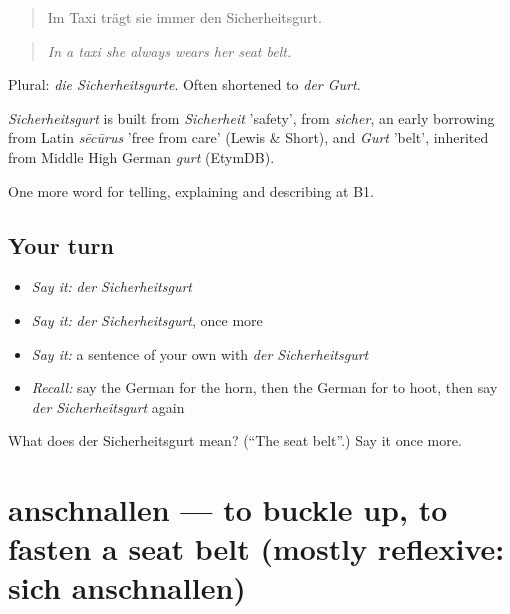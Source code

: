 \begin{quote}
Im Taxi trägt sie immer den Sicherheitsgurt.
\end{quote}

\begin{quote}
\emph{In a taxi she always wears her seat belt.}
\end{quote}

Plural: \emph{die Sicherheitsgurte}. Often shortened to \emph{der Gurt}.

\begin{cousinweb}
\emph{Sicherheitsgurt} is built from \emph{Sicherheit} 'safety', from \emph{sicher}, an early borrowing from Latin \emph{sēcūrus} 'free from care' (Lewis \& Short), and \emph{Gurt} 'belt', inherited from Middle High German \emph{gurt} (EtymDB).
\end{cousinweb}

\begin{grammarlens}[title={What you've built}]
One more word for telling, explaining and describing at B1.
\end{grammarlens}

\subsection*{Your turn}
\begin{itemize}
\raggedright
  \item \emph{Say it:} \emph{der Sicherheitsgurt}
  \item \emph{Say it:} \emph{der Sicherheitsgurt}, once more
  \item \emph{Say it:} a sentence of your own with \emph{der Sicherheitsgurt}
  \item \emph{Recall:} say the German for the horn, then the German for to hoot, then say \emph{der Sicherheitsgurt} again
\end{itemize}

\begin{tcolorbox}[breakable,colback=teal!4,colframe=teal!35!black,title={Before you move on}]
What does der Sicherheitsgurt mean? (\textquotedblleft{}The seat belt\textquotedblright{}.) Say it once more.
\end{tcolorbox}
\section[anschnallen]{anschnallen — to buckle up, to fasten a seat belt (mostly reflexive: sich anschnallen)}

\label{lesson:GE-C401-anschnallen}



